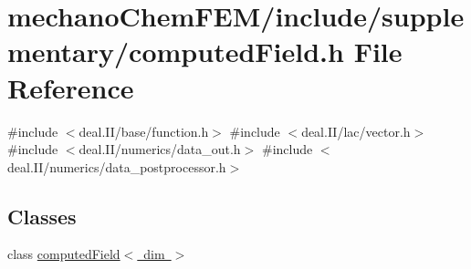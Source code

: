 \section{mechano\+Chem\+F\+E\+M/include/supplementary/computed\+Field.h File Reference}
\label{computed_field_8h}
{\ttfamily \#include $<$deal.\+I\+I/base/function.\+h$>$}\newline
{\ttfamily \#include $<$deal.\+I\+I/lac/vector.\+h$>$}\newline
{\ttfamily \#include $<$deal.\+I\+I/numerics/data\+\_\+out.\+h$>$}\newline
{\ttfamily \#include $<$deal.\+I\+I/numerics/data\+\_\+postprocessor.\+h$>$}\newline
\subsection*{Classes}
\begin{DoxyCompactItemize}
\item 
class \mbox{\hyperlink{classcomputed_field}{computed\+Field$<$ dim $>$}}
\end{DoxyCompactItemize}
